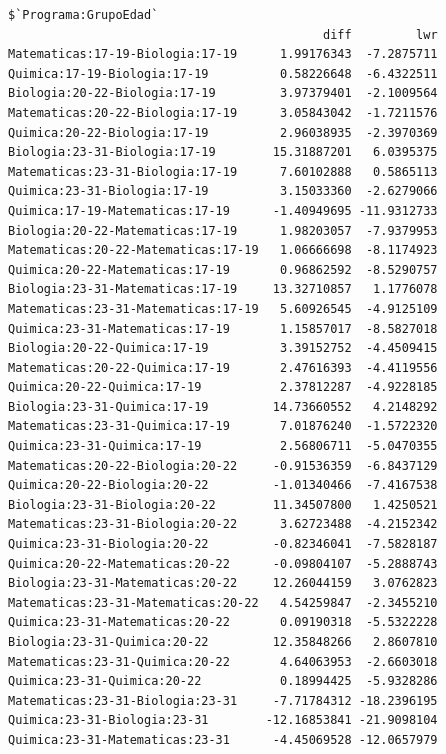 \documentclass{rapport}
\begin{document}
\begin{itemize}
\begin{verbatim}
$`Programa:GrupoEdad`
                                            diff         lwr
Matematicas:17-19-Biologia:17-19      1.99176343  -7.2875711
Quimica:17-19-Biologia:17-19          0.58226648  -6.4322511
Biologia:20-22-Biologia:17-19         3.97379401  -2.1009564
Matematicas:20-22-Biologia:17-19      3.05843042  -1.7211576
Quimica:20-22-Biologia:17-19          2.96038935  -2.3970369
Biologia:23-31-Biologia:17-19        15.31887201   6.0395375
Matematicas:23-31-Biologia:17-19      7.60102888   0.5865113
Quimica:23-31-Biologia:17-19          3.15033360  -2.6279066
Quimica:17-19-Matematicas:17-19      -1.40949695 -11.9312733
Biologia:20-22-Matematicas:17-19      1.98203057  -7.9379953
Matematicas:20-22-Matematicas:17-19   1.06666698  -8.1174923
Quimica:20-22-Matematicas:17-19       0.96862592  -8.5290757
Biologia:23-31-Matematicas:17-19     13.32710857   1.1776078
Matematicas:23-31-Matematicas:17-19   5.60926545  -4.9125109
Quimica:23-31-Matematicas:17-19       1.15857017  -8.5827018
Biologia:20-22-Quimica:17-19          3.39152752  -4.4509415
Matematicas:20-22-Quimica:17-19       2.47616393  -4.4119556
Quimica:20-22-Quimica:17-19           2.37812287  -4.9228185
Biologia:23-31-Quimica:17-19         14.73660552   4.2148292
Matematicas:23-31-Quimica:17-19       7.01876240  -1.5722320
Quimica:23-31-Quimica:17-19           2.56806711  -5.0470355
Matematicas:20-22-Biologia:20-22     -0.91536359  -6.8437129
Quimica:20-22-Biologia:20-22         -1.01340466  -7.4167538
Biologia:23-31-Biologia:20-22        11.34507800   1.4250521
Matematicas:23-31-Biologia:20-22      3.62723488  -4.2152342
Quimica:23-31-Biologia:20-22         -0.82346041  -7.5828187
Quimica:20-22-Matematicas:20-22      -0.09804107  -5.2888743
Biologia:23-31-Matematicas:20-22     12.26044159   3.0762823
Matematicas:23-31-Matematicas:20-22   4.54259847  -2.3455210
Quimica:23-31-Matematicas:20-22       0.09190318  -5.5322228
Biologia:23-31-Quimica:20-22         12.35848266   2.8607810
Matematicas:23-31-Quimica:20-22       4.64063953  -2.6603018
Quimica:23-31-Quimica:20-22           0.18994425  -5.9328286
Matematicas:23-31-Biologia:23-31     -7.71784312 -18.2396195
Quimica:23-31-Biologia:23-31        -12.16853841 -21.9098104
Quimica:23-31-Matematicas:23-31      -4.45069528 -12.0657979


\end{verbatim}
\end{itemize}
\end{document}
